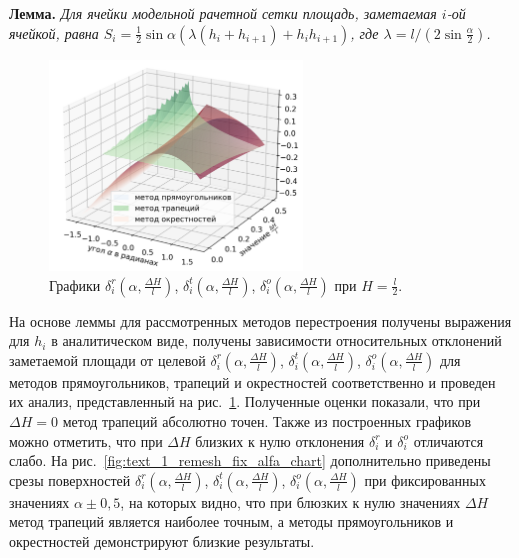 \documentclass[a4paper,14pt]{extarticle}                     %
\theoremstyle{plain}                                         %
\begin{document}
\textbf{Лемма.} \textit{Для ячейки модельной рачетной сетки площадь, заметаемая $i$-ой ячейкой, равна $S_i = \frac{1}{2} \sin \alpha \left( \lambda(h_i + h_{i+1}) + h_ih_{i+1} \right)$, где $\lambda = l / (2 \sin \frac{\alpha}{2})$.}

\begin{figure}[ht]
\centering
\includegraphics[width=0.6\textwidth]{fig/2dr_remesh_3d_chart_big.png}
\singlespacing
\caption{Графики $\delta_i^r(\alpha, \frac{\Delta H}{l})$, $\delta_i^t(\alpha, \frac{\Delta H}{l})$, $\delta_i^o(\alpha, \frac{\Delta H}{l})$ при $H = \frac{l}{2}$.}
\label{fig:text_1_remesh_3d_main_chart}
\end{figure}

На основе леммы для рассмотренных методов перестроения получены выражения для $h_i$ в аналитическом виде, получены зависимости относительных отклонений заметаемой площади от целевой $\delta_i^r(\alpha, \frac{\Delta H}{l})$, $\delta_i^t(\alpha, \frac{\Delta H}{l})$, $\delta_i^o(\alpha, \frac{\Delta H}{l})$ для методов прямоугольников, трапеций и окрестностей соответственно и проведен их анализ, представленный на рис.~\ref{fig:text_1_remesh_3d_main_chart}.
Полученные оценки показали, что при $\Delta H = 0$ метод трапеций абсолютно точен.
Также из построенных графиков можно отметить, что при $\Delta H$ близких к нулю отклонения $\delta_i^r$ и $\delta_i^o$ отличаются слабо.
На рис.~\ref{fig:text_1_remesh_fix_alfa_chart} дополнительно приведены срезы поверхностей $\delta_i^r(\alpha, \frac{\Delta H}{l})$, $\delta_i^t(\alpha, \frac{\Delta H}{l})$, $\delta_i^o(\alpha, \frac{\Delta H}{l})$ при фиксированных значениях $\alpha \pm 0,5$, на которых видно, что при блюзких к нулю значениях $\Delta H$ метод трапеций является наиболее точным, а методы прямоугольников и окрестностей демонстрируют близкие результаты.
\end{document}
